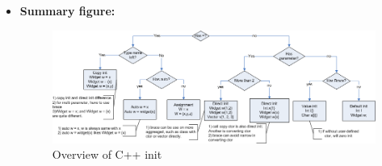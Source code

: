\documentclass[a4paper,11pt,twoside]{book}
\begin{document}
\begin{itemize}
 
	\item \textbf{Summary figure:}
	\begin{figure}[h]
		\centering
		\includegraphics[width=0.95\linewidth]{pics/init.png}
		\caption{Overview of C++ init}
		\label{fig:command}
	\end{figure}
	
\end{itemize}
\end{document}
